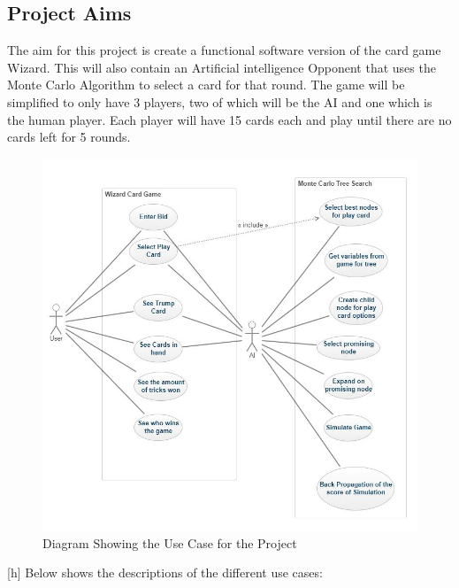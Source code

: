 \subsection{Project Aims}
The aim for this project is create a functional software version of the card game Wizard. This will also contain an Artificial intelligence Opponent that uses the Monte Carlo Algorithm to select a card for that round. The game will be simplified to only have 3 players, two of which will be the AI and one which is the human player. Each player will have 15 cards each and play until there are no cards left for 5 rounds.
\begin{figure}[h]
\centering
\includegraphics[width=15cm]{Wizard_UML}
\caption{Diagram Showing the Use Case for the Project}
\end{figure}[h]
Below shows the descriptions of the different use cases:

